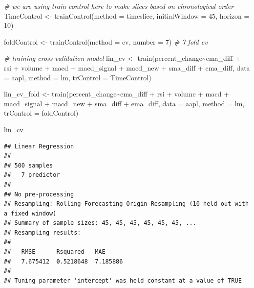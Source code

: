 \documentclass[
]{article}
\newenvironment{Shaded}{\begin{snugshade}}{\end{snugshade}}
\newcommand{\AttributeTok}[1]{\textcolor[rgb]{0.77,0.63,0.00}{#1}}
\newcommand{\CommentTok}[1]{\textcolor[rgb]{0.56,0.35,0.01}{\textit{#1}}}
\newcommand{\DecValTok}[1]{\textcolor[rgb]{0.00,0.00,0.81}{#1}}
\newcommand{\FunctionTok}[1]{\textcolor[rgb]{0.00,0.00,0.00}{#1}}
\newcommand{\NormalTok}[1]{#1}
\newcommand{\OtherTok}[1]{\textcolor[rgb]{0.56,0.35,0.01}{#1}}
\newcommand{\SpecialCharTok}[1]{\textcolor[rgb]{0.00,0.00,0.00}{#1}}
\newcommand{\StringTok}[1]{\textcolor[rgb]{0.31,0.60,0.02}{#1}}
\begin{document}
\begin{Shaded}
\begin{Highlighting}[]
\CommentTok{\# we are using train control here to make slices based on chronological order}
\NormalTok{TimeControl }\OtherTok{\textless{}{-}} \FunctionTok{trainControl}\NormalTok{(}\AttributeTok{method =} \StringTok{\textquotesingle{}timeslice\textquotesingle{}}\NormalTok{,}
                            \AttributeTok{initialWindow =} \DecValTok{45}\NormalTok{,}
                            \AttributeTok{horizon =} \DecValTok{10}\NormalTok{)}

\NormalTok{foldControl }\OtherTok{\textless{}{-}} \FunctionTok{trainControl}\NormalTok{(}\AttributeTok{method =} \StringTok{\textquotesingle{}cv\textquotesingle{}}\NormalTok{, }\AttributeTok{number =} \DecValTok{7}\NormalTok{) }\CommentTok{\# 7 fold cv}


\CommentTok{\# training cross validation model}
\NormalTok{lin\_cv }\OtherTok{\textless{}{-}} \FunctionTok{train}\NormalTok{(percent\_change}\SpecialCharTok{\textasciitilde{}}\NormalTok{ema\_diff }\SpecialCharTok{+}\NormalTok{ rsi }\SpecialCharTok{+}\NormalTok{ volume }\SpecialCharTok{+}\NormalTok{ macd }\SpecialCharTok{+}\NormalTok{ macd\_signal }\SpecialCharTok{+}\NormalTok{ macd\_new }\SpecialCharTok{+}\NormalTok{ sma\_diff }\SpecialCharTok{+}\NormalTok{ ema\_diff, }\AttributeTok{data =}\NormalTok{ aapl, }\AttributeTok{method =} \StringTok{\textquotesingle{}lm\textquotesingle{}}\NormalTok{, }\AttributeTok{trControl =}\NormalTok{ TimeControl)}

\NormalTok{lin\_cv\_fold }\OtherTok{\textless{}{-}} \FunctionTok{train}\NormalTok{(percent\_change}\SpecialCharTok{\textasciitilde{}}\NormalTok{ema\_diff }\SpecialCharTok{+}\NormalTok{ rsi }\SpecialCharTok{+}\NormalTok{ volume }\SpecialCharTok{+}\NormalTok{ macd }\SpecialCharTok{+}\NormalTok{ macd\_signal }\SpecialCharTok{+}\NormalTok{ macd\_new }\SpecialCharTok{+}\NormalTok{ sma\_diff }\SpecialCharTok{+}\NormalTok{ ema\_diff, }\AttributeTok{data =}\NormalTok{ aapl, }\AttributeTok{method =} \StringTok{\textquotesingle{}lm\textquotesingle{}}\NormalTok{, }\AttributeTok{trControl =}\NormalTok{ foldControl)}

\NormalTok{lin\_cv}
\end{Highlighting}
\end{Shaded}

\begin{verbatim}
## Linear Regression 
## 
## 500 samples
##   7 predictor
## 
## No pre-processing
## Resampling: Rolling Forecasting Origin Resampling (10 held-out with a fixed window) 
## Summary of sample sizes: 45, 45, 45, 45, 45, 45, ... 
## Resampling results:
## 
##   RMSE      Rsquared   MAE     
##   7.675412  0.5218648  7.185886
## 
## Tuning parameter 'intercept' was held constant at a value of TRUE
\end{verbatim}
\end{document}

